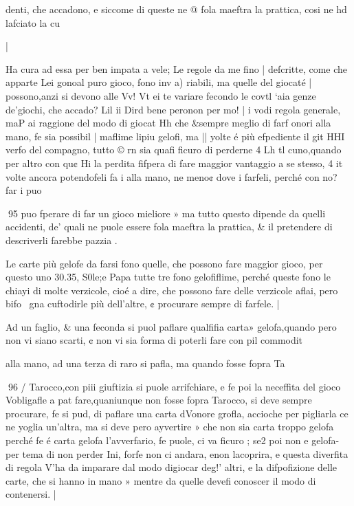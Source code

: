 \documentclass[12pt,a6paper]{article}
\begin{document}
 

denti, che accadono, e siccome
di queste ne @ fola maeftra la
prattica, cosi ne hd lafciato la
cu

 
 

|

Ha cura ad essa per ben impata
a vele; Le regole da me fino
| defcritte, come che apparte
Lei gonoal puro gioco, fono inv
a) riabili, ma quelle del giocaté
| possono,anzi si devono alle Vv!
Vt ei te variare fecondo le covtl
‘aia genze de’giochi, che accado?
Lil ii Dird bene peronon per mo!
| i vodi regola generale, maP
ai raggione del modo di giocat
Hh che &sempre meglio di farf
onori alla mano, fe sia possibil
| maflime lipiu gelofi, ma
|| yolte é più efpediente il git
HHI verfo del compagno, tutto ©
rn  sia quafi ficuro di perderne 4
Lh tl cuno,quando per altro con qu¢
Hi la perdita fifpera di fare maggior
vantaggio a se stesso, 4
it volte ancora potendofeli fa
i alla mano, ne meno¢ dove
i farfeli, perché con no? far
i puo

 

 

 

 

 
95
puo fperare di far un gioco mieliore » ma tutto questo dipende da quelli accidenti, de’ quali
ne puole essere fola maeftra la
prattica, & il pretendere di descriverli farebbe pazzia .

Le carte più gelofe da farsi
fono quelle, che possono fare
maggior gioco, per questo uno
30.35, S0le;e Papa tutte tre fono gelofiflime, perché queste
fono le chiayi di molte verzicole, cioé a dire, che possono fare
delle verzicole aflai, pero bifo~
gna cuftodirle più dell’altre, ¢
procurare sempre di farfele. |

Ad un faglio, & una feconda
si puol paflare qualfifia carta»
gelofa,quando pero non vi siano
scarti, ¢ non vi sia forma di poterli fare con pil commodit

alla mano, ad una terza di raro
si pafla, ma quando fosse fopra
Ta
 

 
96 /
Tarocco,con piii giuftizia si puole arrifchiare, e fe poi la neceffita del gioco Vobligafle a pat fare,quaniunque non fosse fopra
Tarocco, si deve sempre procurare, fe si pud, di paflare una
carta dVonore grofla, accioche
per pigliarla ce ne yoglia un’altra, ma si deve pero ayvertire »
che non sia carta troppo gelofa
perché fe é carta gelofa l’avverfario, fe puole, ci va ficuro ; se2
poi non e gelofa-per tema di
non perder Ini, forfe non ci andara, enon lacoprira, e questa
diverfita di regola V’ha da imparare dal modo digiocar deg!’
altri, e la difpofizione delle
carte, che si hanno in mano »
mentre da quelle devefi conoscer il modo di contenersi. |
\end{document}
